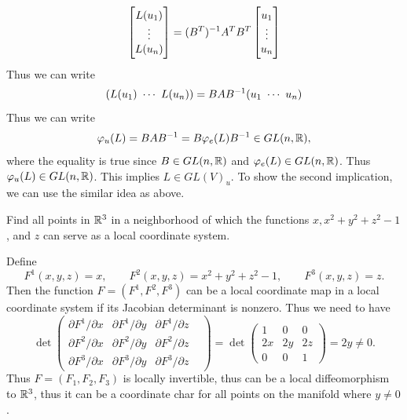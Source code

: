 \begin{solution}
	\[ 
	\begin{bmatrix}
		L(u_1) \\
		\vdots \\
		L(u_n)
	\end{bmatrix}=
	(B^T)^{-1}A^T B^T
	\begin{bmatrix}
		u_1 \\
		\vdots \\
		u_n
	\end{bmatrix}
	\]
	Thus we can write
	\[ (L(u_1)\ \cdots\ L(u_n)) = BA\inv{B} (u_1\ \cdots\ u_n) \]
	Thus we can write
	\[ \varphi_u(L) = BAB^{-1} = B\varphi_e(L) B^{-1} \in GL(n,\mathbb{R}), \]
	where the equality is true since $ B \in GL(n,\mathbb{R}) $ and $ \varphi_e(L) \in GL(n,\mathbb{R}) $. Thus $ \varphi_u(L) \in GL(n,\mathbb{R}) $. This implies $ L \in GL(V)_u $. To show the second implication, we can use the similar idea as above.
	
\end{solution}

\begin{problem}
	Find all points in $ \mathbb{R}^3 $ in a neighborhood of which the functions $ x, x^2 + y^2 + z^2 -1 $, and $ z $ can serve as a local coordinate system.
\end{problem}
\begin{solution}
	Define 
	\[ F^1 (x,y,z) = x, \qquad F^2(x,y,z) = x^2 + y^2 + z^2 -1, \qquad F^3(x,y,z) = z. \]
	Then the function $ F = (F^1,F^2,F^3) $ can be a local coordinate map in a local coordinate system if its Jacobian determinant is nonzero. Thus we need to have
	\[ \det
	\begin{pmatrix}
		\partial F^1/\partial x & \partial F^1/\partial y & \partial F^1/\partial z&  \\
		\partial F^2/\partial x & \partial F^2/\partial y & \partial F^2/\partial z&  \\
		\partial F^3/\partial x & \partial F^3/\partial y & \partial F^3/\partial z& 
	\end{pmatrix}
	= \det
	\begin{pmatrix}
		1 & 0 & 0 \\
		2x & 2y & 2z \\
		0 & 0 & 1
	\end{pmatrix}
	= 2y \neq 0.
	 \]
	Thus $ F = (F_1,F_2,F_3) $ is locally invertible, thus can be a local diffeomorphism to $ \mathbb{R}^3 $, thus it can be a coordinate char for all points on the manifold where $ y \neq 0 $.
\end{solution}


